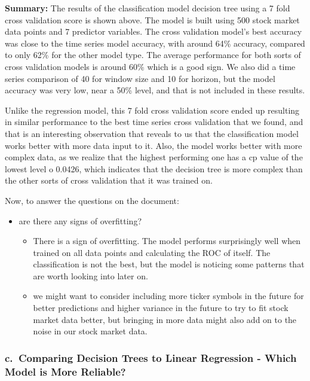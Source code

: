 \documentclass[
]{article}
\begin{document}
\textbf{Summary:} The results of the classification model decision tree
using a 7 fold cross validation score is shown above. The model is built
using 500 stock market data points and 7 predictor variables. The cross
validation model's best accuracy was close to the time series model
accuracy, with around 64\% accuracy, compared to only 62\% for the other
model type. The average performance for both sorts of cross validation
models is around 60\% which is a good sign. We also did a time series
comparison of 40 for window size and 10 for horizon, but the model
accuracy was very low, near a 50\% level, and that is not included in
these results.

Unlike the regression model, this 7 fold cross validation score ended up
resulting in similar performance to the best time series cross
validation that we found, and that is an interesting observation that
reveals to us that the classification model works better with more data
input to it. Also, the model works better with more complex data, as we
realize that the highest performing one has a cp value of the lowest
level o 0.0426, which indicates that the decision tree is more complex
than the other sorts of cross validation that it was trained on.

Now, to answer the questions on the document:

\begin{itemize}
\item
  are there any signs of overfitting?

  \begin{itemize}
  \item
    There is a sign of overfitting. The model performs surprisingly well
    when trained on all data points and calculating the ROC of itself.
    The classification is not the best, but the model is noticing some
    patterns that are worth looking into later on.
  \item
    we might want to consider including more ticker symbols in the
    future for better predictions and higher variance in the future to
    try to fit stock market data better, but bringing in more data might
    also add on to the noise in our stock market data.
  \end{itemize}
\end{itemize}

\hypertarget{c.-comparing-decision-trees-to-linear-regression---which-model-is-more-reliable}{%
\subsubsection{c.~Comparing Decision Trees to Linear Regression - Which
Model is More
Reliable?}\label{c.-comparing-decision-trees-to-linear-regression---which-model-is-more-reliable}}
\end{document}
